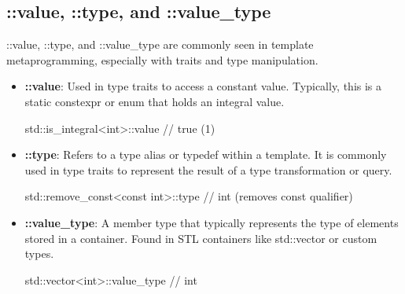 \documentclass{report}
\begin{document}
   \subsection{::value, ::type, and ::value\_type}
   \bigbreak \noindent 
   ::value, ::type, and ::value\_type are commonly seen in template metaprogramming, especially with traits and type manipulation.
   \begin{itemize}
       \item \textbf{::value}: Used in type traits to access a constant value. Typically, this is a static constexpr or enum that holds an integral value. 
           \bigbreak \noindent 
           \begin{cppcode}
           std::is_integral<int>::value  // true (1)
           \end{cppcode}
        \item \textbf{::type}: Refers to a type alias or typedef within a template. It is commonly used in type traits to represent the result of a type transformation or query.
            \bigbreak \noindent 
            \begin{cppcode}
            std::remove_const<const int>::type  // int (removes const qualifier)
            \end{cppcode}
        \item \textbf{::value\_type}: A member type that typically represents the type of elements stored in a container. Found in STL containers like std::vector or custom types.
            \bigbreak \noindent 
            \begin{cppcode}
            std::vector<int>::value_type  // int
            \end{cppcode}

   \end{itemize}
\end{document}
